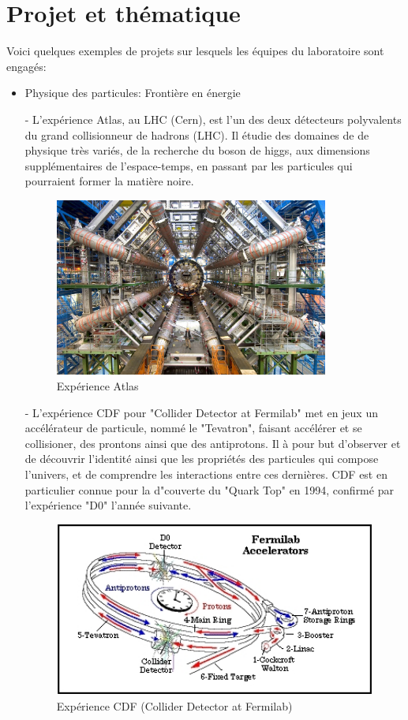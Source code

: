 \documentclass[french,a4paper,12pt]{report}
\begin{document}
  \section{Projet et thématique}
  Voici quelques exemples de projets sur lesquels les équipes du laboratoire sont engagés:
  \begin{itemize}
  \item Physique des particules: Frontière en énergie
  
  	- L'expérience Atlas, au LHC (Cern), est l'un des deux détecteurs polyvalents du grand collisionneur de hadrons (LHC). Il étudie des domaines de de physique très variés, de la recherche du boson de higgs, aux dimensions supplémentaires de l'espace-temps, en passant par les particules qui pourraient former la matière noire.
  	
  \begin{figure}[!ht]
    \center
    \includegraphics[width=9cm]{ATLASLHC.jpg}
    \caption{Expérience Atlas}
	\end{figure}
  	
 	
 	- L'expérience CDF pour "Collider Detector at Fermilab" met en jeux un accélérateur de particule, nommé le "Tevatron", faisant accélérer et se collisioner, des prontons ainsi que des antiprotons. 	Il à pour but d'observer et de découvrir l'identité ainsi que les propriétés des particules qui compose l'univers, et de comprendre les interactions entre ces dernières.
 	CDF est en particulier connue pour la d"couverte du "Quark Top" en 1994, confirmé par l'expérience "D0" l'année suivante.
 	
	\begin{figure}[!ht]
    \center
    \includegraphics[width=11cm]{D0.jpg}
    \caption{Expérience CDF (Collider Detector at Fermilab)}
	\end{figure} 
 	

\end{itemize}
\end{document}
